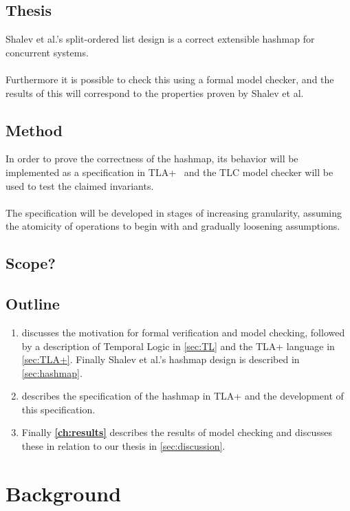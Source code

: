 \documentclass{uit-thesis}
\begin{document}
\section{Thesis}
Shalev et al.'s split-ordered list design is a correct extensible hashmap for concurrent systems.
\\\\
Furthermore it is possible to check this using a formal model checker, and the results of this will correspond to the properties proven by Shalev et al.

\section{Method}
In order to prove the correctness of the hashmap, its behavior will be implemented as a specification in TLA+~\cite{Lamport_specifying_2002} and the TLC model checker will be used to test the claimed invariants.
\\\\
The specification will be developed in stages of increasing granularity, assuming the atomicity of operations to begin with and gradually loosening assumptions.

\section{Scope?}

\section{Outline}
\begin{enumerate}[label={}]
    \item \textbf{} discusses the motivation for formal verification and model checking, followed by a description of Temporal Logic in \autoref{sec:TL} and the TLA+ language in \autoref{sec:TLA+}. Finally Shalev et al.'s hashmap design is described in \autoref{sec:hashmap}.
    \item \textbf{} describes the specification of the hashmap in TLA+ and the development of this specification.
    \item Finally \textbf{\autoref{ch:results}} describes the results of model checking and discusses these in relation to our thesis in \autoref{sec:discussion}. 
\end{enumerate}


\chapter{Background}\label{ch:background}
\end{document}
